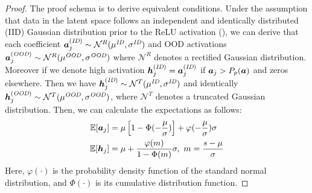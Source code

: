 \documentclass{article} %
\theoremstyle{plain}
\newcommand{\pF}{\va}     %
\begin{document}
\begin{proof}
The proof schema is to derive equivalent conditions. Under the assumption that data in the latent space follows an independent and identically distributed (IID) Gaussian distribution prior to the ReLU activation (\cite{DBLP:conf/nips/SunGL21/ReAct}), we can derive that each coefficient $\pF_j^{(\textit{ID})} \sim \mathcal{N}^{R}(\mu^{\textit{ID}}, \sigma^{\textit{ID}})$ and OOD activations $\pF_j^{(\textit{OOD})} \sim \mathcal{N}^{R}(\mu^{\textit{OOD}}, \sigma^{\textit{OOD}})$ where $\mathcal{N}^{R}$ denotes a rectified Gaussian distribution.
Moreover if we denote high activation $\vh_j^{(\textit{ID})} = \pF_j^{(\textit{ID})}$ if $ \pF_j>P_{p}(\pF) $ and zeros elsewhere. Then we have $ {\bm{h}}_j^{(\textit{ID})} \sim \mathcal{N}^{T}(\mu^{\textit{ID}}, \sigma^{\textit{ID}})$ and identically  ${\bm{h}}_j^{(\textit{OOD})} \sim \mathcal{N}^{T}(\mu^{\textit{OOD}}, \sigma^{\textit{OOD}})$, where $\mathcal{N}^{T}$ denotes a truncated Gaussian distribution.
Then, we can calculate the expectations as follows:
\begin{align}
\mathbb{E}[\pF_j] &=  \mu \left[1- \Phi (-\frac{\mu}{\sigma}) \right] +\varphi (-\frac{\mu}{\sigma})\sigma\\
\mathbb{E}[\vh_j] &=  \mu + \frac{\varphi(m)}{1-\Phi(m)}\sigma, \ m = \frac{s-\mu}{\sigma}
\end{align}
Here, $\varphi (\cdot )$ is the probability density function of the standard normal distribution, and $\Phi (\cdot )$ is its cumulative distribution function. 


\end{proof}
\end{document}
